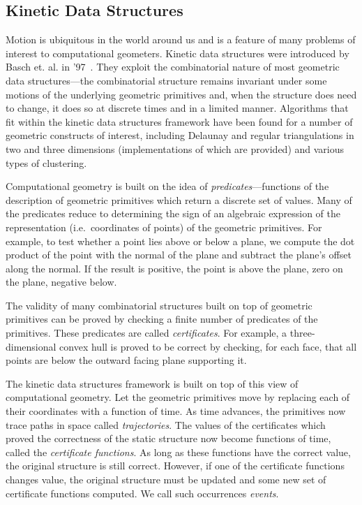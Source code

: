 \subsection{Kinetic Data Structures}
Motion is ubiquitous in the world around us and is a feature of many
problems of interest to computational geometers. Kinetic data
structures were introduced by Basch et. al. in '97~\cite{basch97data,
guibas98kinetic}. They exploit the combinatorial nature of most
geometric data structures---the combinatorial structure remains
invariant under some motions of the underlying geometric primitives
and, when the structure does need to change, it does so at discrete
times and in a limited manner. Algorithms that fit within the kinetic
data structures framework have been found for a number of geometric
constructs of interest, including Delaunay and regular triangulations
in two and three dimensions (implementations of which are provided)
and various types of clustering.

Computational geometry is built on the idea of
\textit{predicates}---functions of the description of geometric
primitives which return a discrete set of values. Many of the
predicates reduce to determining the sign of an algebraic expression
of the representation (i.e.\ coordinates of points) of the geometric
primitives. For example, to test whether a point lies above or below a
plane, we compute the dot product of the point with the normal of the
plane and subtract the plane's offset along the normal. If the result
is positive, the point is above the plane, zero on the plane, negative
below.

The validity of many combinatorial structures built on top of
geometric primitives can be proved by checking a finite number of
predicates of the primitives. These predicates are called {\em
  certificates}. For example, a three-dimensional convex hull is
proved to be correct by checking, for each face, that all points are
below the outward facing plane supporting it.

The kinetic data structures framework is built on top of this view of
computational geometry. Let the geometric primitives move by replacing
each of their coordinates with a function of time. As time advances,
the primitives now trace paths in space called {\em trajectories}. The
values of the certificates which proved the correctness of the static
structure now become functions of time, called the {\em certificate
  functions}. As long as these functions have the correct value, the
original structure is still correct. However, if one of the
certificate functions changes value, the original structure must be
updated and some new set of certificate functions computed. We call
such occurrences {\em events}.

